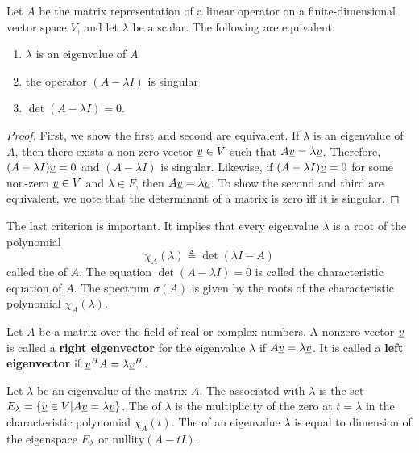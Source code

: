 \begin{theorem}
Let $A$ be the matrix representation of a linear operator on a finite-dimensional vector space $V$, and let $\lambda$ be a scalar.
The following are equivalent:
\begin{enumerate}
\item $\lambda$ is an eigenvalue of $A$
\item the operator $(A - \lambda I)$ is singular
\item $\det (A - \lambda I) = 0$.
\end{enumerate}
\end{theorem}
\begin{proof}
First, we show the first and second are equivalent.
If $\lambda$ is an eigenvalue of $A$, then there exists a non-zero vector $\underline{v} \in V$ such that $A \underline{v} = \lambda \underline{v}$.
Therefore, $(A-\lambda I)\underline{v} = 0$ and $(A - \lambda I)$ is singular.
Likewise, if $(A-\lambda I)\underline{v} = 0$ for some non-zero $\underline{v} \in V$ and $\lambda \in F$, then $A \underline{v} = \lambda \underline{v}$.
To show the second and third are equivalent, we note that the determinant of a matrix is zero iff it is singular.
\end{proof}

The last criterion is important.
It implies that every eigenvalue $\lambda$ is a root of the polynomial 
\[ \chi_A (\lambda) \triangleq \det (\lambda I - A) \]
called the  of $A$.
The equation $\det (A - \lambda I) = 0$ is called the characteristic equation of $A$.
The spectrum $\sigma(A)$ is given by the roots of the characteristic polynomial $\chi_A (\lambda)$.

Let $A$ be a matrix over the field of real or complex numbers.
A nonzero vector $\underline{v}$ is called a \textbf{right eigenvector} for the eigenvalue $\lambda$ if $A \underline{v} = \lambda \underline{v}$.
It is called a \textbf{left eigenvector} if $\underline{v}^H A = \lambda \underline{v}^H$.

\begin{definition}
Let $\lambda$ be an eigenvalue of the matrix $A$.
The  associated with $\lambda$ is the set $E_\lambda = \{ \underline{v} \in V | A \underline{v} = \lambda \underline{v} \}$.
The  of $\lambda$ is the multiplicity of the zero at $t=\lambda$ in the characteristic polynomial $\chi_A (t)$.
The  of an eigenvalue $\lambda$ is equal to dimension of the eigenspace $E_\lambda$ or $\textrm{nullity}(A - t I)$.
\end{definition}

